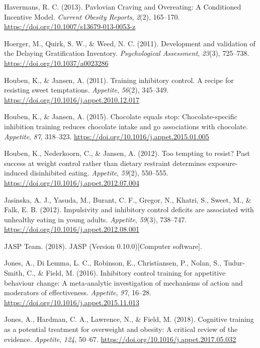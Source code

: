 \documentclass[man,floatsintext]{apa6}
\begin{document}
\leavevmode\hypertarget{ref-havermans_pavlovian_2013}{}%
Havermans, R. C. (2013). Pavlovian Craving and Overeating: A Conditioned Incentive Model. \emph{Current Obesity Reports}, \emph{2}(2), 165--170. \url{https://doi.org/10.1007/s13679-013-0053-z}

\leavevmode\hypertarget{ref-hoerger_development_2011}{}%
Hoerger, M., Quirk, S. W., \& Weed, N. C. (2011). Development and validation of the Delaying Gratification Inventory. \emph{Psychological Assessment}, \emph{23}(3), 725--738. \url{https://doi.org/10.1037/a0023286}

\leavevmode\hypertarget{ref-houben_training_2011}{}%
Houben, K., \& Jansen, A. (2011). Training inhibitory control. A recipe for resisting sweet temptations. \emph{Appetite}, \emph{56}(2), 345--349. \url{https://doi.org/10.1016/j.appet.2010.12.017}

\leavevmode\hypertarget{ref-houben_chocolate_2015}{}%
Houben, K., \& Jansen, A. (2015). Chocolate equals stop: Chocolate-specific inhibition training reduces chocolate intake and go associations with chocolate. \emph{Appetite}, \emph{87}, 318--323. \url{https://doi.org/10.1016/j.appet.2015.01.005}

\leavevmode\hypertarget{ref-houben_too_2012}{}%
Houben, K., Nederkoorn, C., \& Jansen, A. (2012). Too tempting to resist? Past success at weight control rather than dietary restraint determines exposure-induced disinhibited eating. \emph{Appetite}, \emph{59}(2), 550--555. \url{https://doi.org/10.1016/j.appet.2012.07.004}

\leavevmode\hypertarget{ref-jasinska_impulsivity_2012}{}%
Jasinska, A. J., Yasuda, M., Burant, C. F., Gregor, N., Khatri, S., Sweet, M., \& Falk, E. B. (2012). Impulsivity and inhibitory control deficits are associated with unhealthy eating in young adults. \emph{Appetite}, \emph{59}(3), 738--747. \url{https://doi.org/10.1016/j.appet.2012.08.001}

\leavevmode\hypertarget{ref-JASP2018:1}{}%
JASP Team. (2018). JASP (Version 0.10.0){[}Computer software{]}.

\leavevmode\hypertarget{ref-jones_inhibitory_2016}{}%
Jones, A., Di Lemma, L. C., Robinson, E., Christiansen, P., Nolan, S., Tudur-Smith, C., \& Field, M. (2016). Inhibitory control training for appetitive behaviour change: A meta-analytic investigation of mechanisms of action and moderators of effectiveness. \emph{Appetite}, \emph{97}, 16--28. \url{https://doi.org/10.1016/j.appet.2015.11.013}

\leavevmode\hypertarget{ref-jones_cognitive_2018}{}%
Jones, A., Hardman, C. A., Lawrence, N., \& Field, M. (2018). Cognitive training as a potential treatment for overweight and obesity: A critical review of the evidence. \emph{Appetite}, \emph{124}, 50--67. \url{https://doi.org/10.1016/j.appet.2017.05.032}
\end{document}
